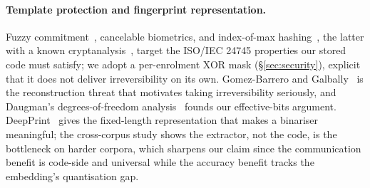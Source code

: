 \paragraph{Template protection and fingerprint representation.} Fuzzy
commitment~\cite{JuelsWattenberg99}, cancelable biometrics, and index-of-max
hashing~\cite{JinEtAl18}, the latter with a known cryptanalysis~\cite{GhammamEtAl20}, target the
ISO/IEC 24745 properties our stored code must satisfy; we adopt a per-enrolment XOR mask
(\S\ref{sec:security}), explicit that it does not deliver irreversibility on its own. Gomez-Barrero and
Galbally~\cite{GomezBarreroGalbally20} is the reconstruction threat that motivates taking
irreversibility seriously, and Daugman's degrees-of-freedom analysis~\cite{Daugman03} founds our
effective-bits argument. DeepPrint~\cite{EngelsmaCaoJain19} gives the fixed-length representation that
makes a binariser meaningful; the cross-corpus study shows the extractor, not the code, is the
bottleneck on harder corpora, which sharpens our claim since the communication benefit is code-side and
universal while the accuracy benefit tracks the embedding's quantisation gap.
